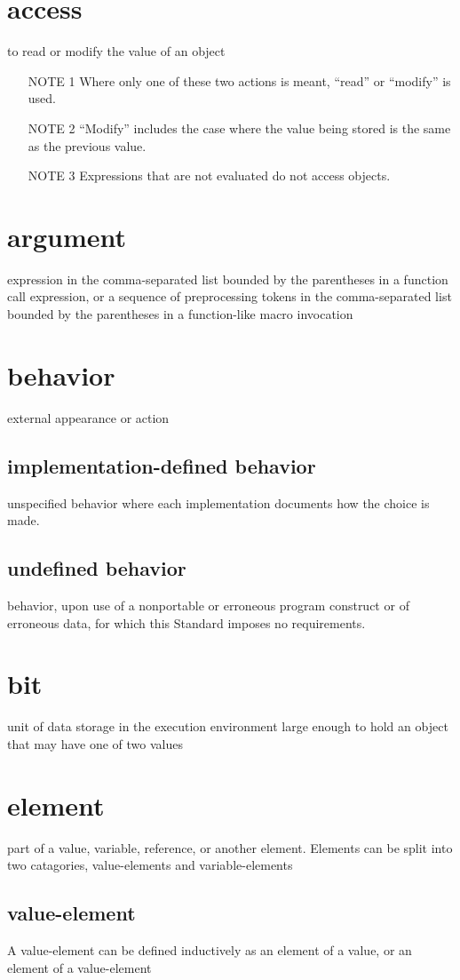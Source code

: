 \section{access}
to read or modify the value of an object
\begin{itemize}
\item[NOTE 1] Where only one of these two actions is meant, ``read'' or ``modify'' is used.
\item[NOTE 2] ``Modify'' includes the case where the value being stored is the same as the previous value.
\item[NOTE 3] Expressions that are not evaluated do not access objects.
\end{itemize}
\section{argument}
expression in the comma-separated list bounded by the parentheses in a function call expression, or a sequence of preprocessing tokens in the comma-separated list bounded by the parentheses in a function-like macro invocation
\section{behavior}
external appearance or action
\subsection{implementation-defined behavior}
unspecified behavior where each implementation documents how the choice is made.
\subsection{undefined behavior}
behavior, upon use of a nonportable or erroneous program construct or of erroneous data,
for which this Standard imposes no requirements.
\section{bit}
unit of data storage in the execution environment large enough to hold an object that may have one of two values
\section{element}
part of a value, variable, reference, or another element. Elements can be split into two catagories, value-elements and variable-elements
\subsection{value-element}
A value-element can be defined inductively as an element of a value, or an element of a value-element
